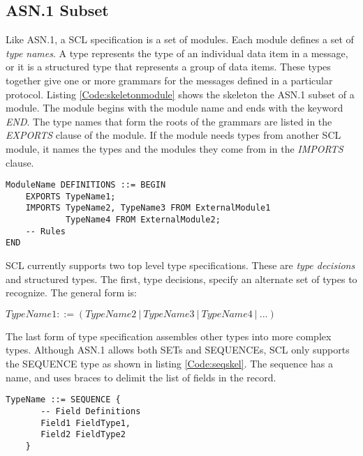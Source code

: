 \documentclass[12pt,oneside,letterpaper]{article}
\begin{document}
\subsection{ASN.1 Subset}
Like ASN.1, a SCL specification is a set of modules. Each module defines a set of \textit{type names}. A type represents the type of an individual data item in a message, or it is a structured type that represents a group of data items. These types together give one or more grammars for the messages defined in a particular protocol. Listing \ref{Code:skeletonmodule} shows the skeleton the ASN.1 subset of a module. The module begins with the module name and ends with the keyword \textit{END}. The type names that form the roots of the grammars are listed in the \textit{EXPORTS} clause of the module. If the module needs types from another SCL module, it names the types and the modules they come from in the \textit{IMPORTS} clause.


\begin{lstlisting}[language=SCL2,style=mystyle,frame=none,
caption=Skeleton Module,label=Code:skeletonmodule, xleftmargin=3.5ex]
ModuleName DEFINITIONS ::= BEGIN
    EXPORTS TypeName1;
    IMPORTS TypeName2, TypeName3 FROM ExternalModule1
            TypeName4 FROM ExternalModule2;
    -- Rules
END
\end{lstlisting}

SCL currently supports two top level type specifications. These are \textit{type decisions}
 and structured types. The first, type decisions, specify an alternate set of types to recognize. The general form is:

\vspace{10pt}
$TypeName1 ::= (TypeName2 \: | \: TypeName3 \: | \: TypeName4 \: | \: ...)$
\vspace{10pt}



The last form of type specification assembles other types into more complex types. Although ASN.1 allows both SETs and SEQUENCEs, SCL only supports the SEQUENCE type as shown in listing \ref{Code:seqskel}. The sequence has a name, and uses braces to delimit the list of fields in the record.

\begin{lstlisting}[language=SCL2,style=mystyle,frame=none,
caption=Skeleton Structure Type,label=Code:seqskel, xleftmargin=3.5ex]
    TypeName ::= SEQUENCE {
       -- Field Definitions
       Field1 FieldType1,
       Field2 FieldType2
    }
\end{lstlisting}
\end{document}
